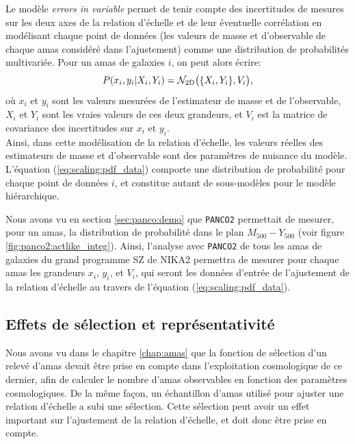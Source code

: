 Le modèle \textit{errors in variable} permet de tenir compte des incertitudes de mesures sur les deux axes de la relation d'échelle et de leur éventuelle corrélation en modélisant chaque point de données (les valeurs de masse et d'observable de chaque amas considéré dans l'ajustement) comme une distribution de probabilités multivariée.
Pour un amas de galaxies $i$, on peut alors écrire:
\begin{equation}
    \label{eq:scaling:pdf_data}
    P(x_i, y_i | X_i, Y_i) = \mathcal{N}_{\rm 2D}\big(\{X_i, Y_i\}, V_i\big),
\end{equation}
où $x_i$ et $y_i$ sont les valeurs mesurées de l'estimateur de masse et de l'observable, $X_i$ et $Y_i$ sont les vraies valeurs de ces deux grandeurs, et $V_i$ est la matrice de covariance des incertitudes sur $x_i$ et $y_i$. \\
Ainsi, dans cette modélisation de la relation d'échelle, les valeurs réelles des estimateurs de masse et d'observable sont des paramètres de nuisance du modèle.
L'équation (\ref{eq:scaling:pdf_data}) comporte une distribution de probabilité pour chaque point de données $i$, et constitue autant de sous-modèles pour le modèle hiérarchique.

Nous avons vu en section \ref{sec:panco:demo} que \texttt{PANCO2} permettait de mesurer, pour un amas, la distribution de probabilité dans le plan $M_{500}-Y_{500}$ (voir figure \ref{fig:panco2:actlike_integ}).
Ainsi, l'analyse avec \texttt{PANCO2} de tous les amas de galaxies du grand programme SZ de NIKA2 permettra de mesurer pour chaque amas les grandeurs $x_i$, $y_i$, et $V_i$, qui seront les données d'entrée de l'ajustement de la relation d'échelle au travers de l'équation (\ref{eq:scaling:pdf_data}).

\subsection{Effets de sélection et représentativité}

Nous avons vu dans le chapitre \ref{chap:amas} que la fonction de sélection d'un relevé d'amas devait être prise en compte dans l'exploitation cosmologique de ce dernier, afin de calculer le nombre d'amas observables en fonction des paramètres cosmologiques.
De la même façon, un échantillon d'amas utilisé pour ajuster une relation d'échelle a subi une sélection.
Cette sélection peut avoir un effet important sur l'ajustement de la relation d'échelle, et doit donc être prise en compte.

